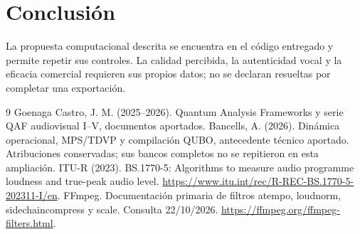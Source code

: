 \documentclass[10pt,a4paper]{article}
\begin{document}
\section{Conclusión}
La propuesta computacional descrita se encuentra en el código entregado y permite repetir sus controles. La calidad percibida, la autenticidad vocal y la eficacia comercial requieren sus propios datos; no se declaran resueltas por completar una exportación.
\begin{thebibliography}{9}
 Goenaga Castro, J. M. (2025--2026). Quantum Analysis Frameworks y serie QAF audiovisual I--V, documentos aportados. Bancells, A. (2026). Dinámica operacional, MPS/TDVP y compilación QUBO, antecedente técnico aportado. Atribuciones conservadas; sus bancos completos no se repitieron en esta ampliación.
 ITU-R (2023). BS.1770-5: Algorithms to measure audio programme loudness and true-peak audio level. \url{https://www.itu.int/rec/R-REC-BS.1770-5-202311-I/en}.
 FFmpeg. Documentación primaria de filtros atempo, loudnorm, sidechaincompress y scale. Consulta 22/10/2026. \url{https://ffmpeg.org/ffmpeg-filters.html}.
\end{thebibliography}
\end{document}

